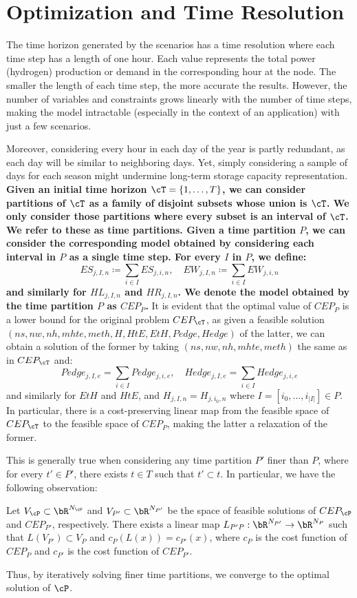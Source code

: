 \section{Optimization and Time Resolution}\label{section:time-resolution}
{
\color{gray}
The time horizon generated by the scenarios has a time resolution where each time step has a length of one hour. Each value represents the total power (hydrogen) production or demand in the corresponding hour at the node. The smaller the length of each time step, the more accurate the results. However, the number of variables and constraints grows linearly with the number of time steps, making the model intractable (especially in the context of an application) with just a few scenarios.

Moreover, considering every hour in each day of the year is partly redundant, as each day will be similar to neighboring days. Yet, simply considering a sample of days for each season might undermine long-term storage capacity representation. 
\textbf{
Given an initial time horizon \(\cT = \{1, \ldots, T\}\), we can consider partitions of \(\cT\) as a family of disjoint subsets whose union is \(\cT\). We only consider those partitions where every subset is an interval of \(\cT\). We refer to these as time partitions. Given a time partition \(P\), we can consider the corresponding model obtained by considering each interval in \(P\) as a single time step. For every \(I\) in \(P\), we define:
\[
ES_{j,I,n} \coloneqq \sum_{i \in I} ES_{j,i,n}, \quad EW_{j,I,n} \coloneqq \sum_{i \in I} EW_{j,i,n}
\]
and similarly for \(HL_{j,I,n}\) and \(HR_{j,I,n}\). We denote the model obtained by the time partition \(P\) as \(CEP_P\).
}
It is evident that the optimal value of \(CEP_P\) is a lower bound for the original problem \(CEP_{\cT}\), as given a feasible solution \((ns, nw, nh, mhte, meth, H, HtE, EtH, Pedge, Hedge)\) of the latter, we can obtain a solution of the former by taking \((ns, nw, nh, mhte, meth)\) the same as in \(CEP_{\cT}\) and:
\[
Pedge_{j,I,e} = \sum_{i \in I} Pedge_{j,i,e}, \quad Hedge_{j,I,e} = \sum_{i \in I} Hedge_{j,i,e}
\]
and similarly for \(EtH\) and \(HtE\), and \(H_{j,I,n} = H_{j,i_0,n}\) where \(I = [i_0,\ldots,i_{|I|}] \in P\). In particular, there is a cost-preserving linear map from the feasible space of \(CEP_{\cT}\) to the feasible space of \(CEP_P\), making the latter a relaxation of the former.

This is generally true when considering any time partition \(P'\) finer than \(P\), where for every \(t' \in P'\), there exists \(t \in T\) such that \(t' \subset t\). In particular, we have the following observation:

\begin{observation}
Let \(V_{\cP} \subset \bR^{N_{\cP}}\) and \(V_{P'} \subset \bR^{N_{P'}}\) be the space of feasible solutions of \(CEP_{\cP}\) and \(CEP_{P'}\), respectively. There exists a linear map \(L_{P'P}: \bR^{N_{P'}} \to \bR^{N_{P}}\) such that \(L(V_{P'}) \subset V_{P}\) and \(c_{P}(L(x)) = c_{P'}(x)\), where \(c_{P}\) is the cost function of \(CEP_{P}\) and \(c_{P'}\) is the cost function of \(CEP_{P'}\).
\end{observation}

Thus, by iteratively solving finer time partitions, we converge to the optimal solution of \(\cP\).}
